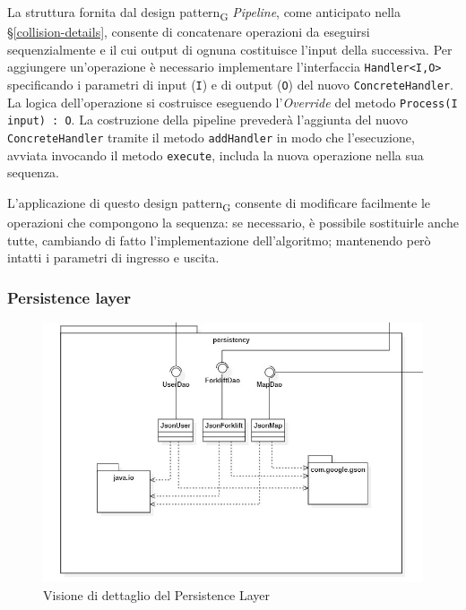         La struttura fornita dal design pattern\textsubscript{G} \textit{Pipeline}, come anticipato nella \S \ref{collision-details}, consente di concatenare operazioni da eseguirsi sequenzialmente e il cui output di ognuna costituisce l'input della successiva. Per aggiungere un'operazione è necessario implementare l'interfaccia \texttt{Handler<I,O>} specificando i parametri di input (\texttt{I}) e di output (\texttt{O}) del nuovo \texttt{ConcreteHandler}. La logica dell'operazione si costruisce eseguendo l'\textit{Override} del metodo \texttt{Process(I input) : O}. La costruzione della pipeline prevederà l'aggiunta del nuovo \texttt{ConcreteHandler} tramite il metodo \texttt{addHandler} in modo che l'esecuzione, avviata invocando il metodo \texttt{execute}, includa la nuova operazione nella sua sequenza.

        L'applicazione di questo design pattern\textsubscript{G} consente di modificare facilmente le operazioni che compongono la sequenza: se necessario, è possibile sostituirle anche tutte, cambiando di fatto l'implementazione dell'algoritmo; mantenendo però intatti i parametri di ingresso e uscita.



\subsubsection{Persistence layer}

\begin{figure}[H]
	\centering
	\includegraphics[scale=0.50]{res/diagrams/server/server_persistency.jpg}
	\caption{Visione di dettaglio del Persistence Layer}
\end{figure}

